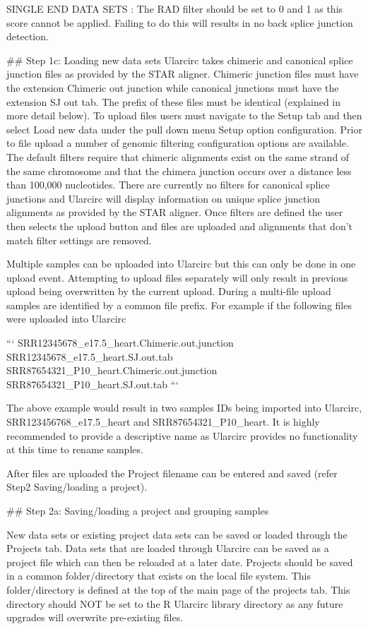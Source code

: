SINGLE END DATA SETS : The RAD filter should be set to 0 and 1 as this score cannot be applied. Failing to do this will results in no back splice junction detection.

## Step 1c: Loading new data sets
Ularcirc takes chimeric and canonical splice junction files as provided by the STAR aligner. Chimeric junction files must have the extension Chimeric out junction while canonical junctions must have the extension SJ out tab. The prefix of these files must be identical (explained in more detail below). To upload files users must navigate to the Setup tab and then select Load new data under the pull down menu Setup option configuration. Prior to file upload a number of genomic filtering configuration options are available. The default filters require that chimeric alignments exist on the same strand of the same chromosome and that the chimera junction occurs over a distance less than 100,000 nucleotides.  There are currently no filters for canonical splice junctions and Ularcirc will display information on unique splice junction alignments as provided by the STAR aligner. Once filters are defined the user then selects the upload button and files are uploaded and alignments that don’t match filter settings are removed.

Multiple samples can be uploaded into Ularcirc but this can only be done in one upload event. Attempting to upload files separately will only result in previous upload being overwritten by the current upload. During a multi-file upload samples are identified by a common file prefix.  For example if the following files were uploaded into Ularcirc

```
SRR12345678_e17.5_heart.Chimeric.out.junction 
SRR12345678_e17.5_heart.SJ.out.tab            
SRR87654321_P10_heart.Chimeric.out.junction   
SRR87654321_P10_heart.SJ.out.tab
```


The above example would result in two samples IDs being imported into Ularcirc, SRR123456768_e17.5_heart and SRR87654321_P10_heart. It is highly recommended to provide a descriptive name as Ularcirc provides no functionality at this time to rename samples.

After files are uploaded the Project filename can be entered and saved (refer Step2 Saving/loading a project).


## Step 2a: Saving/loading a project and grouping samples

New data sets or existing project data sets can be saved or loaded through the Projects tab. Data sets that are loaded through Ularcirc can be saved as a project file which can then be reloaded at a later date. Projects should be saved in a common folder/directory that exists on the local file system. This folder/directory is defined at the top of the  main page of the projects tab. This directory should NOT be set to the R Ularcirc library  directory as any future upgrades will overwrite pre-existing files. 

